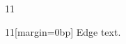 \documentclass[paper=A4]{ropas-poster}
\begin{document}
\begin{postergrid}{1}{1}
\begin{posterblock}{1}{1}[margin=0bp]
Edge text.
\end{posterblock}
\end{postergrid}
\end{document}
